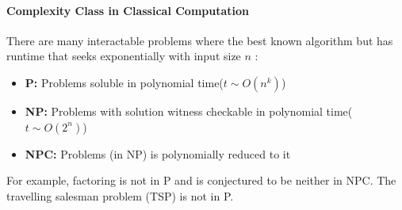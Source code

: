 \documentclass[]{book}
\theoremstyle{nonumberplain}
\begin{document}
\paragraph{Complexity Class in Classical Computation}
There are many interactable problems where the best known algorithm but has runtime that seeks exponentially with input size $n$ : 
\begin{itemize}
    \item \textbf{P: }Problems soluble in polynomial time($t\sim O(n^k)$)
    \item \textbf{NP: }Problems with solution witness checkable in polynomial time($t\sim O(2^n)$)
    \item \textbf{NPC: }Problems (in NP) is polynomially reduced to it
\end{itemize}
For example, factoring is not in P and is conjectured to be neither in NPC. The travelling salesman problem (TSP) is not in P. 
\end{document}
